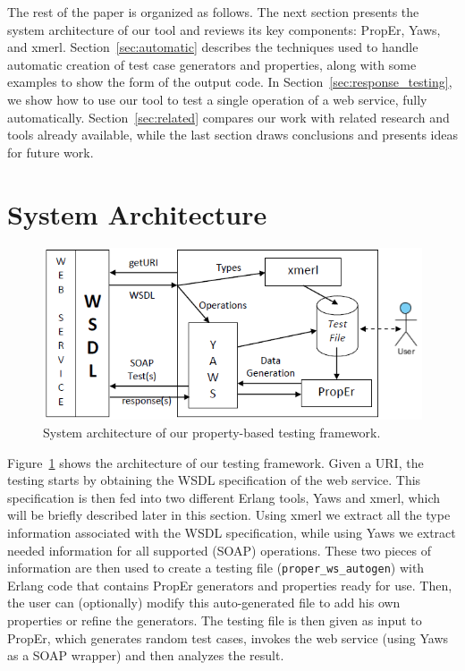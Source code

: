 \documentclass[copyright]{eptcs}
\begin{document}

The rest of the paper is organized as follows.
The next section presents the system architecture of our tool and
reviews its key components: PropEr, Yaws, and xmerl.
Section~\ref{sec:automatic} describes the techniques used to handle
automatic creation of test case generators and properties, along with
some examples to show the form of the output code.
In Section~\ref{sec:response_testing}, we show how to use our tool to
test a single operation of a web service, fully automatically.
Section~\ref{sec:related} compares our work with related research and
tools already available, while the last section draws conclusions and
presents ideas for future work.

\section{System Architecture} \label{sec:architecture}

\begin{figure}[!b]
\centering
\includegraphics[height=.245\textheight]{Framework.png}
\caption{System architecture of our property-based testing framework.}
\label{fig:architecture}
\end{figure}

Figure~\ref{fig:architecture} shows the architecture of our testing
framework. Given a URI, the testing starts by obtaining the WSDL
specification of the web service. This specification is then fed into
two different Erlang tools, Yaws and xmerl, which will be briefly
described later in this section. Using xmerl we extract all the type
information associated with the WSDL specification, while using Yaws
we extract needed information for all supported (SOAP) operations.
These two pieces of information are then used to create a testing file
(\texttt{proper\_ws\_autogen}) with Erlang code that contains PropEr
generators and properties ready for use. Then, the user can
(optionally) modify this auto-generated file to add his own properties
or refine the generators. The testing file is then given as input to
PropEr, which generates random test cases, invokes the web service
(using Yaws as a SOAP wrapper) and then analyzes the result.
\end{document}
